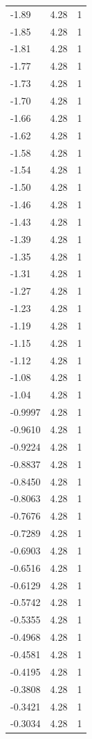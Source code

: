 \begin{longtable}{lrr}
  -1.89 & 4.28 & 1 \\
  -1.85 & 4.28 & 1 \\
  -1.81 & 4.28 & 1 \\
  -1.77 & 4.28 & 1 \\
  -1.73 & 4.28 & 1 \\
  -1.70 & 4.28 & 1 \\
  -1.66 & 4.28 & 1 \\
  -1.62 & 4.28 & 1 \\
  -1.58 & 4.28 & 1 \\
  -1.54 & 4.28 & 1 \\
  -1.50 & 4.28 & 1 \\
  -1.46 & 4.28 & 1 \\
  -1.43 & 4.28 & 1 \\
  -1.39 & 4.28 & 1 \\
  -1.35 & 4.28 & 1 \\
  -1.31 & 4.28 & 1 \\
  -1.27 & 4.28 & 1 \\
  -1.23 & 4.28 & 1 \\
  -1.19 & 4.28 & 1 \\
  -1.15 & 4.28 & 1 \\
  -1.12 & 4.28 & 1 \\
  -1.08 & 4.28 & 1 \\
  -1.04 & 4.28 & 1 \\
  -0.9997 & 4.28 & 1 \\
  -0.9610 & 4.28 & 1 \\
  -0.9224 & 4.28 & 1 \\
  -0.8837 & 4.28 & 1 \\
  -0.8450 & 4.28 & 1 \\
  -0.8063 & 4.28 & 1 \\
  -0.7676 & 4.28 & 1 \\
  -0.7289 & 4.28 & 1 \\
  -0.6903 & 4.28 & 1 \\
  -0.6516 & 4.28 & 1 \\
  -0.6129 & 4.28 & 1 \\
  -0.5742 & 4.28 & 1 \\
  -0.5355 & 4.28 & 1 \\
  -0.4968 & 4.28 & 1 \\
  -0.4581 & 4.28 & 1 \\
  -0.4195 & 4.28 & 1 \\
  -0.3808 & 4.28 & 1 \\
  -0.3421 & 4.28 & 1 \\
  -0.3034 & 4.28 & 1 \\

\end{longtable}
